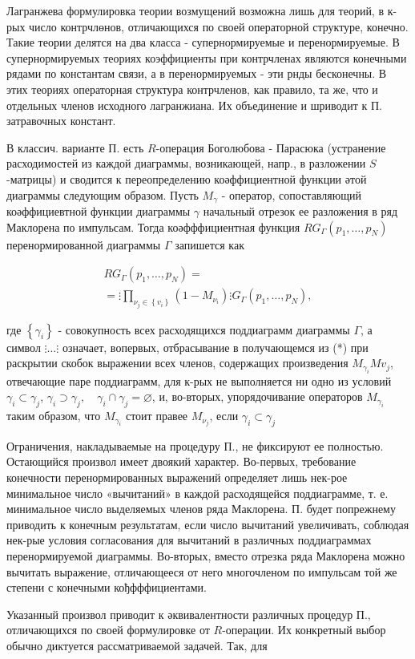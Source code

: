 \documentclass[10pt]{article}
\begin{document}
Лагранжева формулировка теории возмущений возможна лишь для теорий, в к-рых число контрчлөнов, отличающихся по своей операторной структуре, конечно. Такие теории делятся на два класса - супернормируемые и перенормируемые. В супернормируемых теориях коэффициенты при контрчленах являются конечными рядами по константам связи, а в перенормируемых - эти рнды бесконечны. В этих теориях операторная структура контрчленов, как правило, та же, что и отдельных членов исходного лагранжиана. Их объединение и шриводит к П. затравочных констант.



В классич. варианте П. есть $R$-операция Боголюбова - Парасюка (устранение расходимостей из каждой диаграммы, возникающей, напр., в разложении $S$-матрицы) и сводится к переопределению коәффициентной функции әтой диаграммы следующим образом. Пусть $M_{\gamma}$ - оператор, сопоставляющий коәффициевтной функции диаграммы $\gamma$ начальный отрезок ее разложения в ряд Маклорена по импульсам. Тогда коәфффициентная функция $R G_{\Gamma}\left(p_{1}, \ldots, p_{N}\right)$ перенормированной диаграммы $\Gamma$ запишется как



\[

\begin{gathered}

R G_{\Gamma}\left(p_{1}, \ldots, p_{N}\right)= \\

=\vdots \prod_{\nu_{j} \in\left\{v_{i}\right\}}\left(1-M_{\nu_{i}}\right) \vdots G_{\Gamma}\left(p_{1}, \ldots, p_{N}\right),

\end{gathered}

\]



где $\left\{\gamma_{i}\right\}$ - совокупность всех расходящихся поддиаграмм диаграммы $\Gamma$, а символ $\vdots \ldots \vdots$ означает, вопервых, отбрасывание в получающемся из (*) при раскрытии скобок выражении всех членов, содержащих произведения $M_{\gamma_{i}} M v_{j}$, отвечающие паре поддиаграмм, для к-рых не выполняется ни одно из условий $\gamma_{i} \subset \gamma_{j}$, $\gamma_{i} \supset \gamma_{j}, \quad \gamma_{i} \cap \gamma_{j}=\varnothing$, и, во-вторых, упорядочивание операторов $M_{\gamma_{i}}$ таким образом, что $M_{\gamma_{i}}$ стоит правее $M_{\nu_{j}}$, если $\gamma_{i} \subset \gamma_{j}$



Ограничения, накладываемые на процедуру П., не фиксируют ее полностью. Остающийся произвол имеет двоякий характер. Во-первых, требование конечности перенормированных выражений определяет лишь нек-рое минимальное число «вычитаний» в каждой расходящейся поддиаграмме, т. е. минимальное число выделяемых членов ряда Маклорена. П. будет попрежнему приводить к конечным результатам, если число вычитаний увеличивать, соблюдая нек-рые условия согласования для вычитаний в различных поддиаграммах перенормируемой диаграммы. Во-вторых, вместо отрезка ряда Маклорена можно вычитать выражение, отличающееся от него многочленом по импульсам той же степени с конечными кођфффициентами.



Указанный произвол приводит к әквивалентности различных процедур П., отличающихся по своей формулировке от $R$-операции. Их конкретный выбор обычно диктуется рассматриваемой задачей. Так, для
\end{document}
